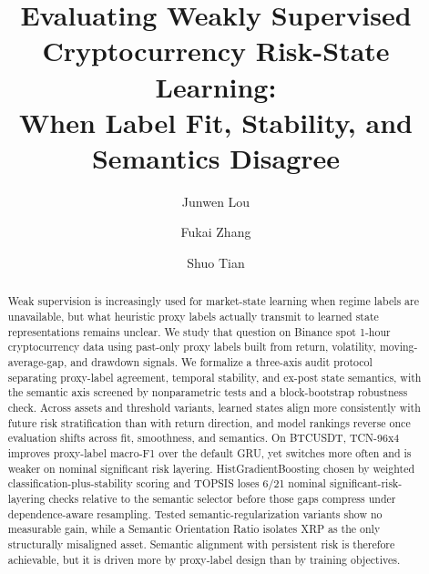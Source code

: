 \documentclass[a4paper,fleqn]{cas-dc}
\begin{document}
\let\WriteBookmarks\relax
\def\floatpagepagefraction{1}
\def\textpagefraction{.001}
\hypersetup{hidelinks,hypertexnames=false}
\pdfstringdefDisableCommands{\def\\{ }}


\title[mode=title]{Evaluating Weakly Supervised Cryptocurrency Risk-State Learning:\\When Label Fit, Stability, and Semantics Disagree}

\author[1]{Junwen Lou}
\cormark[1]

\author[1]{Fukai Zhang}
\fnmark[1]

\author[1]{Shuo Tian}
\fnmark[1]



\begin{abstract}
Weak supervision is increasingly used for market-state learning when regime labels are unavailable, but what heuristic proxy labels actually transmit to learned state representations remains unclear. We study that question on Binance spot 1-hour cryptocurrency data using past-only proxy labels built from return, volatility, moving-average-gap, and drawdown signals. We formalize a three-axis audit protocol separating proxy-label agreement, temporal stability, and ex-post state semantics, with the semantic axis screened by nonparametric tests and a block-bootstrap robustness check. Across assets and threshold variants, learned states align more consistently with future risk stratification than with return direction, and model rankings reverse once evaluation shifts across fit, smoothness, and semantics. On BTCUSDT, TCN-96x4 improves proxy-label macro-F1 over the default GRU, yet switches more often and is weaker on nominal significant risk layering. HistGradientBoosting chosen by weighted classification-plus-stability scoring and TOPSIS loses 6/21 nominal significant-risk-layering checks relative to the semantic selector before those gaps compress under dependence-aware resampling. Tested semantic-regularization variants show no measurable gain, while a Semantic Orientation Ratio isolates XRP as the only structurally misaligned asset. Semantic alignment with persistent risk is therefore achievable, but it is driven more by proxy-label design than by training objectives.
\end{abstract}
\end{document}
